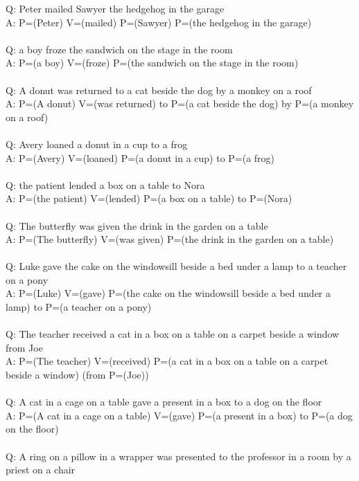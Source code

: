 \documentclass{article} \usepackage{iclr2022_conference,times}
\begin{document}
{Q: Peter mailed Sawyer the hedgehog in the garage \\
A: P=(Peter) V=(mailed) P=(Sawyer) P=(the hedgehog in the garage) \\
 \\
Q: a boy froze the sandwich on the stage in the room \\
A: P=(a boy) V=(froze) P=(the sandwich on the stage in the room) \\
 \\
Q: A donut was returned to a cat beside the dog by a monkey on a roof \\
A: P=(A donut) V=(was returned) to P=(a cat beside the dog) by P=(a monkey on a roof) \\
 \\
Q: Avery loaned a donut in a cup to a frog \\
A: P=(Avery) V=(loaned) P=(a donut in a cup) to P=(a frog) \\
 \\
Q: the patient lended a box on a table to Nora \\
A: P=(the patient) V=(lended) P=(a box on a table) to P=(Nora) \\
 \\
Q: The butterfly was given the drink in the garden on a table \\
A: P=(The butterfly) V=(was given) P=(the drink in the garden on a table) \\
 \\
Q: Luke gave the cake on the windowsill beside a bed under a lamp to a teacher on a pony \\
A: P=(Luke) V=(gave) P=(the cake on the windowsill beside a bed under a lamp) to P=(a teacher on a pony) \\
 \\
Q: The teacher received a cat in a box on a table on a carpet beside a window from Joe \\
A: P=(The teacher) V=(received) P=(a cat in a box on a table on a carpet beside a window) (from P=(Joe)) \\
 \\
Q: A cat in a cage on a table gave a present in a box to a dog on the floor \\
A: P=(A cat in a cage on a table) V=(gave) P=(a present in a box) to P=(a dog on the floor) \\
 \\
Q: A ring on a pillow in a wrapper was presented to the professor in a room by a priest on a chair \\
}
\end{document}
